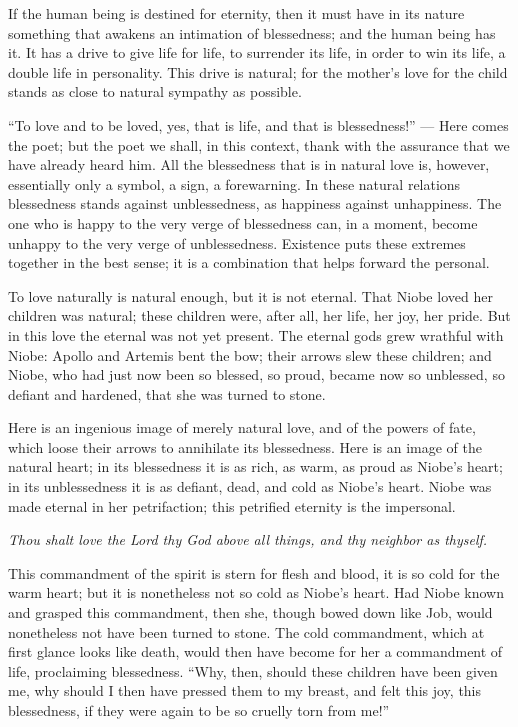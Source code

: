 \documentclass[12pt,a4paper]{book}
\begin{document}
If the human being is destined for eternity, then it must have in its nature something that awakens an intimation of blessedness; and the human being has it. It has a drive to give life for life, to surrender its life, in order to win its life, a double life in personality. This drive is natural; for the mother's love for the child stands as close to natural sympathy as possible.

``To love and to be loved, yes, that is life, and that is blessedness!'' --- Here comes the poet; but the poet we shall, in this
context, thank with the assurance that we have already heard him. All the blessedness that is in natural love is, however, essentially only a symbol, a sign, a forewarning. In these natural relations blessedness stands against unblessedness, as happiness against unhappiness. The one who is happy to the very verge of blessedness can, in a moment, become unhappy to the very verge of unblessedness. Existence puts these extremes together in the best sense; it is a combination that helps forward the personal.

To love naturally is natural enough, but it is not eternal. That Niobe loved her children was natural; these children were, after all, her life, her joy, her pride. But in this love the eternal was not yet present. The eternal gods grew wrathful with Niobe: Apollo and Artemis bent the bow; their arrows slew these children; and Niobe, who had just now been so blessed, so proud, became now so unblessed, so defiant and hardened, that she was turned to stone.

Here is an ingenious image of merely natural love, and of the powers of fate, which loose their arrows to annihilate its blessedness. Here is an image of the natural heart; in its blessedness it is as rich, as warm, as proud as Niobe's heart; in its unblessedness it is as defiant, dead, and cold as Niobe's heart. Niobe was made eternal in her petrifaction; this petrified eternity is the impersonal.

\emph{Thou shalt love the Lord thy God above all things, and thy neighbor as thyself.}

This commandment of the spirit is stern for flesh and blood, it is so cold for the warm heart; but it is nonetheless not so cold as Niobe's heart. Had Niobe known and grasped this commandment, then she, though bowed down like Job, would nonetheless not have been turned to stone. The cold commandment, which at first glance looks like death, would then have become for her a commandment of life, proclaiming blessedness.
``Why, then, should these children have been given me, why should I then have pressed them to my breast, and felt this joy, this blessedness, if they were again to be so cruelly torn from me!''
\end{document}
